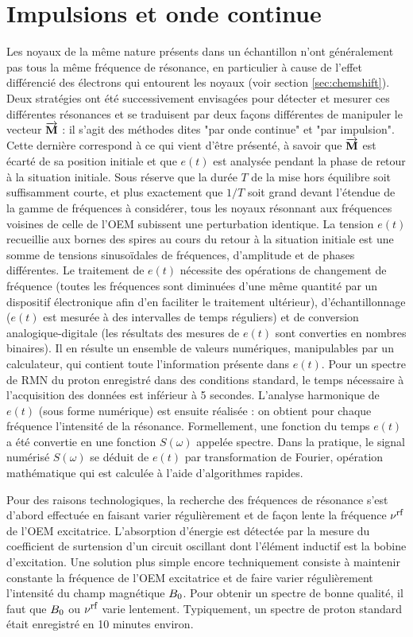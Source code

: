 \section{Impulsions et onde continue}
Les noyaux de la même nature présents dans un échantillon n'ont généralement
pas tous la même fréquence de résonance, en particulier à cause de
l'effet différencié des électrons qui entourent les noyaux
(voir section \ref{sec:chemshift}).
Deux stratégies ont été successivement envisagées pour détecter et mesurer ces
différentes résonances et se traduisent par deux
façons différentes de manipuler le vecteur $\overrightarrow{\mathbf{M}}$ :
il s'agit des méthodes dites "par onde continue" et "par impulsion".
Cette dernière correspond à ce qui vient d'être présenté, à
savoir que $\overrightarrow{\mathbf{M}}$ est écarté de sa position initiale
et que $e(t)$ est analysée pendant la phase de retour à la situation initiale.
Sous réserve que la durée $T$ de la mise hors équilibre soit
suffisamment courte, et plus exactement que $1/T$ soit grand devant l'étendue de la
gamme de fréquences à considérer, tous les noyaux résonnant aux fréquences voisines
de celle de l'OEM subissent une perturbation identique.
La tension $e(t)$ recueillie aux bornes des spires au cours du retour
à la situation initiale est une somme de tensions
sinusoïdales de fréquences, d'amplitude et de phases différentes.
Le traitement de $e(t)$ nécessite des opérations de changement de fréquence
(toutes les fréquences sont diminuées d'une même quantité par un dispositif
électronique afin d'en faciliter le traitement ultérieur),
d'échantillonnage ($e(t)$ est mesurée à des intervalles de temps
réguliers) et de conversion analogique-digitale
(les résultats des mesures de $e(t)$ sont
converties en nombres binaires).
Il en résulte un ensemble de valeurs numériques,
manipulables par un calculateur,
qui contient toute l'information présente dans $e(t)$.
Pour un spectre de RMN du proton enregistré dans des conditions standard,
le temps nécessaire à l'acquisition des données est inférieur à 5 secondes.
L'analyse harmonique de $e(t)$ (sous forme numérique) est ensuite réalisée :
on obtient pour chaque fréquence l'intensité de la résonance.
Formellement, une fonction du temps $e(t)$ a été convertie en une fonction $S(\omega)$
appelée spectre.
Dans la pratique, le signal numérisé $S(\omega)$ se déduit de $e(t)$ par
transformation de Fourier, opération mathématique qui est calculée à l'aide
d'algorithmes rapides.

Pour des raisons technologiques, la recherche des
fréquences de résonance s'est d'abord effectuée
en faisant varier régulièrement et de façon
lente la fréquence $\nu^{\mbox{\footnotesize{rf}}}$ de l'OEM excitatrice.
L'absorption d'énergie est détectée par la mesure du
coefficient de surtension d'un circuit oscillant dont l'élément inductif est la bobine
d'excitation.
Une solution plus simple encore techniquement consiste à maintenir
constante la fréquence de l'OEM excitatrice et de faire varier régulièrement l'intensité
du champ magnétique $B_0$.
Pour obtenir un spectre de bonne qualité, il faut que $B_0$ ou $\nu^{\mbox{\footnotesize{rf}}}$ varie
lentement.
Typiquement, un spectre de proton standard était enregistré en 10 minutes
environ.

